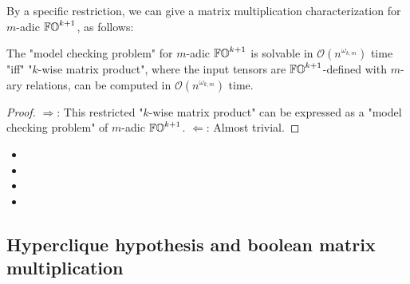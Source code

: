 By a specific restriction, we can give a matrix multiplication characterization for $m$-adic $\mathbb{FO}^{k+1}$,
as follows:
\begin{proposition}\label{proposition: FOmk model checking and matrix multiplication}
  The "model checking problem" for $m$-adic $\mathbb{FO}^{k+1}$ is solvable in $\mathcal{O}(n^{\omega_{k,m}})$ time
  "iff"
  "$k$-wise matrix product", where the input tensors are $\mathbb{FO}^{k+1}$-defined with $m$-ary relations,
   can be computed in $\mathcal{O}(n^{\omega_{k,m}})$ time.
\end{proposition}
\begin{proof}
  $\Longrightarrow$: This restricted "$k$-wise matrix product" can be expressed as a "model checking problem" of $m$-adic $\mathbb{FO}^{k+1}$.
  $\Longleftarrow$: Almost trivial.
\end{proof}

\begin{itemize}
    \item {}
    \item {}
    \item {}
    \item {}
\end{itemize}

\subsection{Hyperclique hypothesis and boolean matrix multiplication}

